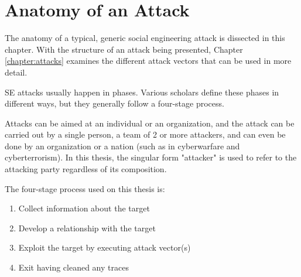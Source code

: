 



\chapter{Anatomy of an Attack\label{chapter:anatomy}}
\begin{comment}

Guides:
    - About 2 pages

TODO:
    [ ] Cover how SE attacks are cyclical

What to cover:
    - The 4-Stage process of SE
        - Gather OSINT
        - Build relationship
        - Exploit relationship / launch the attack
        - Exit / cover traces
    - Cyclical nature of SE attacks
    
Literature:
    - 

\end{comment}

The anatomy of a typical, generic social engineering attack is dissected in this chapter. With the structure of an attack being presented, Chapter \ref{chapter:attacks} examines the different attack vectors that can be used in more detail.

SE attacks usually happen in phases. Various scholars define these phases in different ways, but they generally follow a four-stage process.

Attacks can be aimed at an individual or an organization, and the attack can be carried out by a single person, a team of 2 or more attackers, and can even be done by an organization or a nation (such as in cyberwarfare and cyberterrorism). In this thesis, the singular form "attacker" is used to refer to the attacking party regardless of its composition.

The four-stage process used on this thesis is:

\begin{enumerate}
    \item Collect information about the target
    \item Develop a relationship with the target
    \item Exploit the target by executing attack vector(s)
    \item Exit having cleaned any traces
\end{enumerate}


